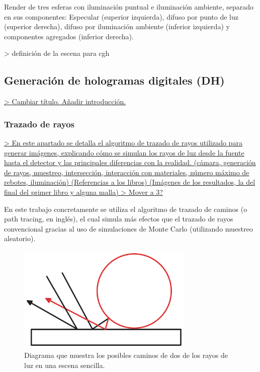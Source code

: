 \documentclass[10pt, a4paper]{article}
\begin{document}
    \caption{Render de tres esferas con iluminación puntual e iluminación ambiente, separado en sus componentes: Especular (superior izquierda), difuso por punto de luz (superior derecha), difuso por iluminación ambiente (inferior izquierda) y componentes agregados (inferior derecha).}

> definición de la escena para cgh

\subsection{Generación de hologramas digitales (DH)}

\underline{> Cambiar título. Añadir introducción.}

\subsubsection{Trazado de rayos}

\underline{> En este apartado se detalla el algoritmo de trazado de rayos utilizado para generar imágenes, explicando cómo se simulan los rayos de luz desde la fuente hasta el detector y las principales diferencias con la realidad. (cámara, generación de rayos, muestreo, intersección, interacción con materiales, número máximo de rebotes, iluminación) (Referencias a los libros) (Imágenes de los resultados, la del final del primer libro y alguna malla)
> Mover a 3?}

En este trabajo concretamente se utiliza el algoritmo de trazado de caminos (o path tracing, en inglés), el cual simula más efectos que el trazado de rayos convencional gracias al uso de simulaciones de Monte Carlo (utilizando muestreo aleatorio).

\begin{figure}[h]
     \centering 
    \includegraphics[width=0.75\textwidth]{bounces}

    \caption{Diagrama que muestra los posibles caminos de dos de los rayos de luz en una escena sencilla.}
\end{figure}
\end{document}
